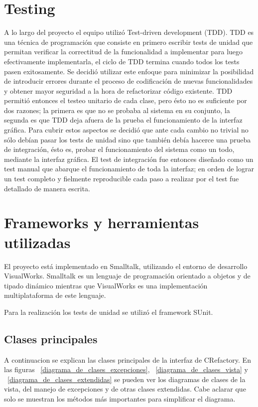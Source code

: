 \documentclass[a4paper,oneside,12pt]{article}
\begin{document}
\section{Testing}
\label{sec:testing}
A lo largo del proyecto el equipo utiliz\'o Test-driven development (TDD). TDD es una t\'ecnica de programaci\'on que consiste en primero escribir tests de unidad que permitan verificar la correctitud de la funcionalidad a implementar para luego efectivamente implementarla, el ciclo de TDD termina cuando todos los tests pasen exitosamente. Se decidi\'o utilizar este enfoque para minimizar la posibilidad de introducir errores durante el proceso de codificaci\'on de nuevas funcionalidades y obtener mayor seguridad a la hora de refactorizar c\'odigo existente.
TDD permiti\'o entonces el testeo unitario de cada clase, pero \'esto no es suficiente por dos razones; la primera es que no se probaba al sistema en su conjunto, la segunda es que TDD deja afuera de la prueba el funcionamiento de la interfaz gr\'afica. Para cubrir estos aspectos se decidi\'o que ante cada cambio no trivial no s\'olo deb\'ian pasar los tests de unidad sino que tambi\'en deb\'ia hacerce una prueba de integraci\'on, \'esto es, probar el funcionamiento del sistema como un todo, mediante la interfaz gr\'afica. El test de integraci\'on fue entonces diseñado como un test manual que abarque el funcionamiento de toda la interfaz; en orden de lograr un test completo y fielmente reproducible cada paso a realizar por el test fue detallado de manera escrita.

\section{Frameworks y herramientas utilizadas}
\label{sec:frameworks_and_tools}
El proyecto est\'a implementado en Smalltalk, utilizando el entorno de desarrollo VisualWorks. Smalltalk es un lenguaje de programaci\'on orientado a objetos y de tipado din\'amico mientras que VisualWorks es una implementaci\'on multiplataforma de este lenguaje.

Para la realizaci\'on los tests de unidad se utiliz\'o el framework SUnit.

\subsection{Clases principales}

A continuacion se explican las clases principales de la interfaz de CRefactory. En las figuras ~\ref{diagrama_de_clases_excepciones}, ~\ref{diagrama_de_clases_vista} y ~\ref{diagrama_de_clases_extendidas} se pueden ver los diagramas de clases de la vista, del manejo de excepciones y de otras clases extendidas. Cabe aclarar que solo se muestran los m\'etodos m\'as importantes para simplificar el diagrama.
\end{document}
